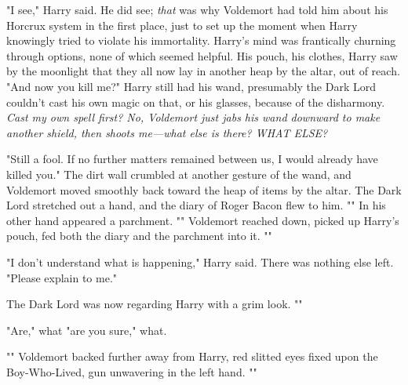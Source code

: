 "I see," Harry said. He did see; \emph{that} was why Voldemort had told him
about his Horcrux system in the first place, just to set up the moment when
Harry knowingly tried to violate his immortality. Harry's mind was frantically
churning through options, none of which seemed helpful. His pouch, his clothes,
Harry saw by the moonlight that they all now lay in another heap by the altar,
out of reach. "And now you kill me?" Harry still had his wand, presumably the
Dark Lord couldn't cast his own magic on that, or his glasses, because of the
disharmony. \emph{Cast my own spell first? No, Voldemort just jabs his wand
downward to make another shield, then shoots me---what else is there? WHAT
ELSE?}

"Still a fool. If no further matters remained between us, I would already have
killed you." The dirt wall crumbled at another gesture of the wand, and
Voldemort moved smoothly back toward the heap of items by the altar. The Dark
Lord stretched out a hand, and the diary of Roger Bacon flew to him.
"" In
his other hand appeared a parchment. "" Voldemort reached down, picked up Harry's pouch, fed both
the diary and the parchment into it. ""

"I don't understand what is happening," Harry said. There was nothing else
left. "Please explain to me."

The Dark Lord was now regarding Harry with a grim look. ""

"Are," what "are you sure," what.

"" Voldemort backed further away
from Harry, red slitted eyes fixed upon the Boy-Who-Lived, gun unwavering in
the left hand. ""

